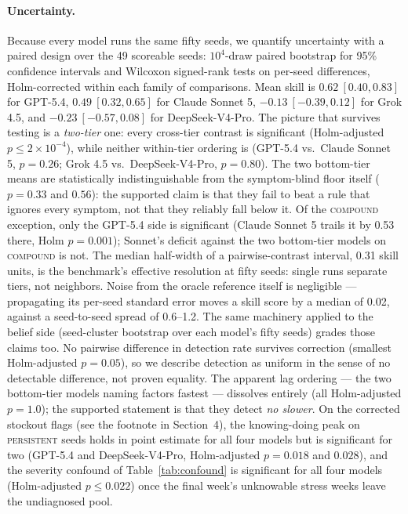 \documentclass{article}
\begin{document}
\paragraph{Uncertainty.} Because every model runs the same fifty seeds, we
quantify uncertainty with a paired design over the 49 scoreable seeds:
$10^4$-draw paired bootstrap for 95\% confidence intervals and Wilcoxon
signed-rank tests on per-seed differences, Holm-corrected within each
family of comparisons. Mean skill is $0.62\ [0.40, 0.83]$ for GPT-5.4,
$0.49\ [0.32, 0.65]$ for Claude Sonnet 5, $-0.13\ [-0.39, 0.12]$ for
Grok 4.5, and $-0.23\ [-0.57, 0.08]$ for DeepSeek-V4-Pro. The picture that
survives testing is a \emph{two-tier} one: every cross-tier contrast is
significant (Holm-adjusted $p \le 2\times10^{-4}$), while neither
within-tier ordering is (GPT-5.4 vs.\ Claude Sonnet 5, $p = 0.26$;
Grok 4.5 vs.\ DeepSeek-V4-Pro, $p = 0.80$). The two bottom-tier means are
statistically indistinguishable from the symptom-blind floor itself
($p = 0.33$ and $0.56$): the supported claim is that they fail to beat a
rule that ignores every symptom, not that they reliably fall below it. Of
the \textsc{compound} exception, only the GPT-5.4 side is significant
(Claude Sonnet 5 trails it by 0.53 there, Holm $p = 0.001$); Sonnet's
deficit against the two bottom-tier models on \textsc{compound} is not.
The median half-width of a pairwise-contrast interval, 0.31 skill units,
is the benchmark's effective resolution at fifty seeds: single runs
separate tiers, not neighbors. Noise from the oracle reference itself is
negligible --- propagating its per-seed standard error moves a skill score
by a median of 0.02, against a seed-to-seed spread of 0.6--1.2. The same
machinery applied to the belief side (seed-cluster bootstrap over each
model's fifty seeds) grades those claims too. No pairwise difference in
detection rate survives correction (smallest Holm-adjusted $p = 0.05$), so
we describe detection as uniform in the sense of no detectable difference,
not proven equality. The apparent lag ordering --- the two bottom-tier
models naming factors fastest --- dissolves entirely (all Holm-adjusted
$p = 1.0$); the supported statement is that they detect \emph{no slower}.
On the corrected stockout flags (see the footnote in Section~4), the
knowing-doing peak on \textsc{persistent} seeds holds in point estimate
for all four models but is significant for two (GPT-5.4 and
DeepSeek-V4-Pro, Holm-adjusted $p = 0.018$ and $0.028$), and the severity
confound of Table~\ref{tab:confound} is significant for all four models
(Holm-adjusted $p \le 0.022$) once the final week's unknowable stress
weeks leave the undiagnosed pool.
\end{document}
